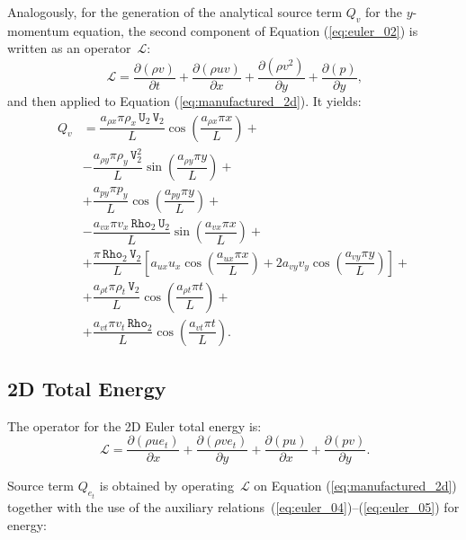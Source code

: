 \documentclass[10pt]{article}
\newcommand{\Diff}[2] {\dfrac{\partial( #1)}{\partial #2}}
\newcommand{\Rho}{\,\mathtt{Rho}}
\newcommand{\U}{\,\mathtt{U}}
\newcommand{\V}{\,\mathtt{V}}
\newcommand{\Lo}{\,\mathcal{L}}
\begin{document}
Analogously, for the generation of the analytical source term $Q_v$ for the $y$-momentum equation, the second component of Equation  (\ref{eq:euler_02})  is written as an  operator $\Lo$:
\begin{equation*}
   \Lo =\Diff{\rho v}{t} + \Diff{\rho u v}{x} + \Diff{\rho  v^2 }{y}+ \Diff{p}{y},
\end{equation*}
and then applied to Equation  (\ref{eq:manufactured_2d}). It yields:
\begin{equation}
 \begin{split}
Q_v &=\dfrac{ a_{\rho x} \pi \rho_x \U_2 \V_2 }{L}\cos\left(\dfrac{a_{\rho x} \pi x}{L}\right)+\\
&-\dfrac{a_{\rho y} \pi \rho_y \V_2^2 }{L}\sin\left(\dfrac{a_{\rho y} \pi y}{L}\right)+\\
&+\dfrac{a_{py} \pi p_y}{L}\cos\left(\dfrac{a_{py} \pi y}{L}\right) +\\
&-\dfrac{ a_{vx} \pi v_x \Rho_2 \U_2}{L}\sin\left(\dfrac{a_{vx} \pi x}{L}\right)+\\
&+\dfrac{\pi \Rho_2 \V_2}{L}\left[a_{ux} u_x \cos\left(\dfrac{a_{ux} \pi x}{L}\right)+2 a_{vy} v_y  \cos\left(\dfrac{a_{vy} \pi y}{L}\right)\right]+\\
&+  \dfrac{a_{\rho t} \pi \rho_t \V_2 }{L}\cos\left(\dfrac{a_{\rho t} \pi t}{L}\right)+\\
&+\dfrac{a_{vt} \pi v_t \Rho_2 }{L}\cos\left(\dfrac{a_{vt} \pi t}{L}\right).
 \end{split}
\end{equation}



\subsection{2D Total Energy}

The operator for the 2D Euler total energy is:
\begin{equation*}
 \Lo=  \Diff{\rho ue_t }{x}+\Diff{\rho ve_t}{y}+\Diff{pu}{x} +\Diff{pv}{y}.
\end{equation*}


Source term $Q_{e_t}$ is obtained by operating $\Lo$ on Equation  (\ref{eq:manufactured_2d}) together with the use of the  auxiliary relations~(\ref{eq:euler_04})--(\ref{eq:euler_05}) for energy:
\end{document}
